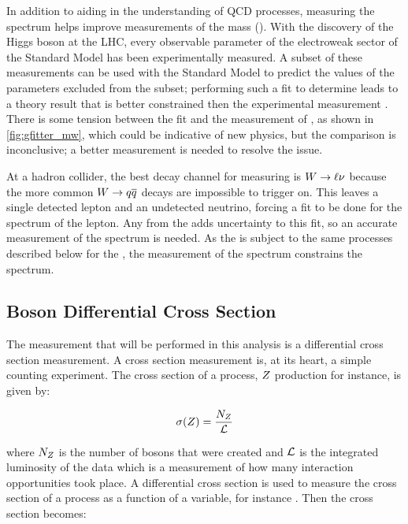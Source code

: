 In addition to aiding in the understanding of QCD processes, measuring the \Z
\bosonpt spectrum helps improve measurements of the \W mass (\MassW). With the
discovery of the Higgs boson at the LHC, every observable parameter of the
electroweak sector of the Standard Model has been experimentally measured. A
subset of these measurements can be used with the Standard Model to predict the
values of the parameters excluded from the subset; performing such a fit to
determine \MassW leads to a theory result that is better constrained then the
experimental measurement \cite{baak_2014}. There is some tension between the
fit and the measurement of \MassW, as shown in \cref{fig:gfitter_mw}, which
could be indicative of new physics, but the comparison is inconclusive; a
better measurement is needed to resolve the issue. %

At a hadron collider, the best decay channel for measuring \MassW is ${W \to \ell \nu}$
because the more common ${W \to q \overline{q}}$ decays are impossible to trigger on. This
leaves a single detected lepton and an undetected neutrino, forcing a fit to be
done for the \pt spectrum of the lepton. Any \bosonpt from the \W adds
uncertainty to this fit, so an accurate measurement of the \W \bosonpt spectrum
is needed. As the \W is subject to the same processes described below for the
\Z, the measurement of the \Z \bosonpt spectrum constrains the \W \bosonpt
spectrum.



\subsection{\texorpdfstring{\Z}{Z} Boson Differential Cross Section}

The measurement that will be performed in this analysis is a differential cross
section measurement. A cross section measurement is, at its heart, a simple
counting experiment. The cross section of a process, $Z$ production for
instance, is given by:

\begin{equation}\label{eq:xsec}
    \sigma(Z) = \frac{N_{Z}}{\mathcal{L}}
\end{equation}

where $N_{Z}$ is the number of \Z bosons that were created and $\mathcal{L}$
is the integrated luminosity of the data which is a measurement of how many
interaction opportunities took place. A differential cross section is used to
measure the cross section of a process as a function of a variable, for
instance \bosonpt. Then the cross section becomes:

